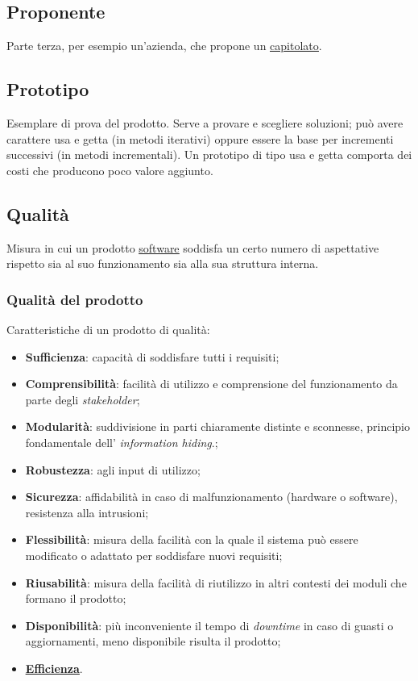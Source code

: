 	\subsection{Proponente}
	\label{sec:proponente}
	Parte terza, per esempio un'azienda, che propone un \underline{\hyperref[sec:capitolato]{capitolato}}.


	\subsection{Prototipo}
	\label{sec:prototipo}
	Esemplare di prova del prodotto. Serve a provare e scegliere soluzioni; può avere carattere usa e getta (in metodi iterativi) oppure essere la base per incrementi successivi (in metodi incrementali).
	Un prototipo di tipo usa e getta comporta dei costi che producono poco valore aggiunto.


	\newpage


	\subsection{Qualità}
	\label{sec:qualita}
	 Misura in cui un prodotto \underline{\hyperref[sec:prodottosoftware]{software}} soddisfa un certo numero di aspettative rispetto sia al suo funzionamento sia alla sua struttura interna.
	\subsubsection{Qualità del prodotto}
	\label{sec:qualitaprodotto}
	Caratteristiche di un prodotto di qualità:
	\begin{itemize}
	\item \textbf{Sufficienza}: capacità di soddisfare tutti i requisiti;
	\item \textbf{Comprensibilità}: facilità di utilizzo e comprensione del funzionamento da parte degli  \emph{stakeholder};
	\item \textbf{Modularità}: suddivisione in parti chiaramente distinte e sconnesse, principio fondamentale dell' \emph{information hiding}.;
	\item \textbf{Robustezza}: agli input di utilizzo;
	\item \textbf{Sicurezza}: affidabilità in caso di malfunzionamento (hardware o software), resistenza alla intrusioni;
	\item \textbf{Flessibilità}: misura della facilità con la quale il sistema può essere modificato o adattato per soddisfare nuovi requisiti;
	\item \textbf{Riusabilità}: misura della facilità di riutilizzo in altri contesti dei moduli che formano il prodotto;
	\item \textbf{Disponibilità}: più inconveniente il tempo di \emph{downtime} in caso di guasti o aggiornamenti, meno disponibile risulta il prodotto;
	\item \textbf{\underline{\hyperref[sec:efficienza]{Efficienza}}}.
	\end{itemize}
